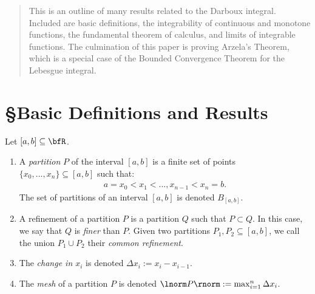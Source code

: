 \documentclass[10pt,twoside,openany]{memoir}
\begin{document}

\begin{abstract}
    This is an outline of many results related to the Darboux integral. Included are basic definitions, the integrability of continuous and monotone functions, the fundamental theorem of calculus, and limits of integrable functions. The culmination of this paper is proving Arzela's Theorem, which is a special case of the Bounded Convergence Theorem for the Lebesgue integral.
\end{abstract}

\section*{\S\:\:Basic Definitions and Results}
    \begin{definition}
        Let $[a,b] \subseteq \bfR$.
        \begin{enumerate}[label = (\arabic*),itemsep=1pt,topsep=3pt]
            \item A \textit{partition} $P$ of the interval $[a,b]$ is a finite set of points $\{x_0,...,x_n\} \subseteq [a,b]$ such that:
                \begin{equation*}
                \begin{split}
                    a = x_0 < x_1 < ... , x_{n-1} < x_n = b.
                \end{split}
                \end{equation*}
            The set of partitions of an interval $[a,b]$ is denoted $B_{[a,b]}$.
            \item A refinement of a partition $P$ is a partition $Q$ such that $P \subset Q$. In this case, we say that $Q$ is \textit{finer} than $P$. Given two partitions $P_1,P_2 \subseteq [a,b]$, we call the union $P_1 \cup P_2$ their \textit{common refinement}.
            \item The \textit{change in $x_i$} is denoted $\Delta x_i := x_{i} - x_{i-1}$.
            \item The \textit{mesh} of a partition $P$ is denoted $\lnorm P \rnorm := \max_{i = 1}^n \Delta x_i$.
        \end{enumerate}
    \end{definition}
\end{document}
